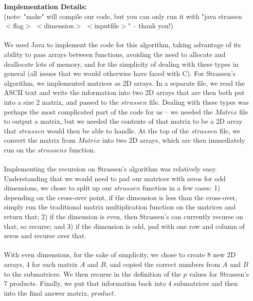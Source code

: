 \documentclass[11pt]{article}
\begin{document}
\textbf{Implementation Details:} \\ (note: "make" will compile our code, but you can only run it with "java strassen $<$flag$>$ $<$dimension$>$ $<$inputfile$>$" -- thank you!)\\\\
We used Java to implement the code for this algorithm, taking advantage of its ability to pass arrays between functions, avoiding the need to allocate and deallocate lots of memory, and for the simplicity of dealing with these types in general (all issues that we would otherwise have faced with C). For Strassen's algorithm, we implemented matrices as 2D arrays. In a separate file, we read the ASCII text and write the information into two 2D arrays that are then both put into a size 2 matrix, and passed to the $strassen$ file. Dealing with these types was perhaps the most complicated part of the code for us -- we needed the $Matrix$ file to output a matrix, but we needed the contents of that matrix to be a 2D array that $strassen$ would then be able to handle. At the top of the $strassen$ file, we convert the matrix from $Matrix$ into two 2D arrays, which are then immediately run on the $strassens$ function. \\\\
Implementing the recursion on Strassen's algorithm was relatively easy. Understanding that we would need to pad our matrices with zeros for odd dimensions, we chose to split up our $strassen$ function in a few cases: 1) depending on the cross-over point, if the dimension is less than the cross-over, simply run the traditional matrix multiplication function on the matrices and return that; 2) if the dimension is even, then Strassen's can currently recurse on that, so recurse; and 3) if the dimension is odd, pad with one row and column of zeros and recurse over that. \\\\
With even dimensions, for the sake of simplicity, we chose to create 8 new 2D arrays, 4 for each matrix $A$ and $B$, and copied the correct numbers from $A$ and $B$ to the submatrices. We then recurse in the definition of the $p$ values for Strassen's 7 products. Finally, we put that information back into 4 submatrices and then into the final answer matrix, $product$. \\\\
\end{document}
